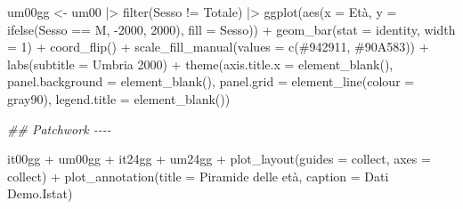 \documentclass[
]{article}
\newenvironment{Shaded}{\begin{snugshade}}{\end{snugshade}}
\newcommand{\AttributeTok}[1]{\textcolor[rgb]{0.40,0.45,0.13}{#1}}
\newcommand{\DecValTok}[1]{\textcolor[rgb]{0.68,0.00,0.00}{#1}}
\newcommand{\DocumentationTok}[1]{\textcolor[rgb]{0.37,0.37,0.37}{\textit{#1}}}
\newcommand{\FunctionTok}[1]{\textcolor[rgb]{0.28,0.35,0.67}{#1}}
\newcommand{\NormalTok}[1]{\textcolor[rgb]{0.00,0.23,0.31}{#1}}
\newcommand{\OtherTok}[1]{\textcolor[rgb]{0.00,0.23,0.31}{#1}}
\newcommand{\SpecialCharTok}[1]{\textcolor[rgb]{0.37,0.37,0.37}{#1}}
\newcommand{\StringTok}[1]{\textcolor[rgb]{0.13,0.47,0.30}{#1}}
\begin{document}
\begin{Shaded}
\begin{Highlighting}[]
\NormalTok{um00gg }\OtherTok{\textless{}{-}}\NormalTok{ um00 }\SpecialCharTok{|\textgreater{}} 
  \FunctionTok{filter}\NormalTok{(Sesso }\SpecialCharTok{!=} \StringTok{\textquotesingle{}Totale\textquotesingle{}}\NormalTok{) }\SpecialCharTok{|\textgreater{}} 
  \FunctionTok{ggplot}\NormalTok{(}\FunctionTok{aes}\NormalTok{(}\AttributeTok{x =}\NormalTok{ Età,}
             \AttributeTok{y =} \FunctionTok{ifelse}\NormalTok{(Sesso }\SpecialCharTok{==} \StringTok{\textquotesingle{}M\textquotesingle{}}\NormalTok{,}
                        \SpecialCharTok{{-}}\StringTok{\textasciigrave{}}\AttributeTok{2000}\StringTok{\textasciigrave{}}\NormalTok{, }\StringTok{\textasciigrave{}}\AttributeTok{2000}\StringTok{\textasciigrave{}}\NormalTok{),}
             \AttributeTok{fill =}\NormalTok{ Sesso)) }\SpecialCharTok{+}
  \FunctionTok{geom\_bar}\NormalTok{(}\AttributeTok{stat =} \StringTok{\textquotesingle{}identity\textquotesingle{}}\NormalTok{, }\AttributeTok{width =} \DecValTok{1}\NormalTok{) }\SpecialCharTok{+}
  \FunctionTok{coord\_flip}\NormalTok{() }\SpecialCharTok{+}
  \FunctionTok{scale\_fill\_manual}\NormalTok{(}\AttributeTok{values =} \FunctionTok{c}\NormalTok{(}\StringTok{\textquotesingle{}\#942911\textquotesingle{}}\NormalTok{, }\StringTok{\textquotesingle{}\#90A583\textquotesingle{}}\NormalTok{)) }\SpecialCharTok{+}
  \FunctionTok{labs}\NormalTok{(}\AttributeTok{subtitle =} \StringTok{\textquotesingle{}Umbria 2000\textquotesingle{}}\NormalTok{) }\SpecialCharTok{+}
  \FunctionTok{theme}\NormalTok{(}\AttributeTok{axis.title.x =} \FunctionTok{element\_blank}\NormalTok{(),}
        \AttributeTok{panel.background =} \FunctionTok{element\_blank}\NormalTok{(),}
        \AttributeTok{panel.grid =} \FunctionTok{element\_line}\NormalTok{(}\AttributeTok{colour =} \StringTok{\textquotesingle{}gray90\textquotesingle{}}\NormalTok{),}
        \AttributeTok{legend.title =} \FunctionTok{element\_blank}\NormalTok{())}

\DocumentationTok{\#\# Patchwork {-}{-}{-}{-}}

\NormalTok{it00gg }\SpecialCharTok{+}\NormalTok{ um00gg }\SpecialCharTok{+}\NormalTok{ it24gg }\SpecialCharTok{+}\NormalTok{ um24gg }\SpecialCharTok{+}
  \FunctionTok{plot\_layout}\NormalTok{(}\AttributeTok{guides =} \StringTok{\textquotesingle{}collect\textquotesingle{}}\NormalTok{, }\AttributeTok{axes =} \StringTok{\textquotesingle{}collect\textquotesingle{}}\NormalTok{) }\SpecialCharTok{+}
  \FunctionTok{plot\_annotation}\NormalTok{(}\AttributeTok{title =} \StringTok{\textquotesingle{}Piramide delle età\textquotesingle{}}\NormalTok{,}
                  \AttributeTok{caption =} \StringTok{\textquotesingle{}Dati Demo.Istat\textquotesingle{}}\NormalTok{)}
\end{Highlighting}
\end{Shaded}
\end{document}
